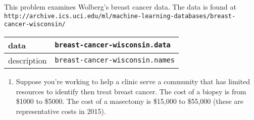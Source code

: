 \documentclass{article}
\begin{document}
 This problem examines Wolberg's breast cancer data\cite{WMbreast90}.  The data is found at\\
  {\texttt {http://archive.ics.uci.edu/ml/machine-learning-databases/breast-cancer-wisconsin/}}\\
  \begin{tabular}{l||l}
data & {\texttt{breast-cancer-wisconsin.data}}\\ \hline 
description &  {\texttt{breast-cancer-wisconsin.names}}  
\end{tabular}
\begin{enumerate}\item  Suppose you're working to help a clinic serve a community that has limited resources to identify then treat breast cancer.  The cost of a biopsy is from \$1000 to \$5000.  The cost of a masectomy is \$15,000 to \$55,000 (these are representative costs in 2015).   


\end{enumerate}
\end{document}
